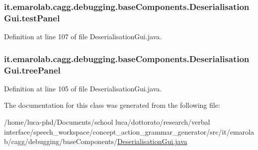 \hypertarget{classit_1_1emarolab_1_1cagg_1_1debugging_1_1baseComponents_1_1DeserialisationGui_a5827585bdffe37f8cedd0af6fddb2052}{
\subsubsection[{test\-Panel}]{ it.\-emarolab.\-cagg.\-debugging.\-base\-Components.\-Deserialisation\-Gui.\-test\-Panel\hspace{0.3cm}{\ttfamily [private]}}}\label{classit_1_1emarolab_1_1cagg_1_1debugging_1_1baseComponents_1_1DeserialisationGui_a5827585bdffe37f8cedd0af6fddb2052}


Definition at line 107 of file Deserialisation\-Gui.\-java.

\hypertarget{classit_1_1emarolab_1_1cagg_1_1debugging_1_1baseComponents_1_1DeserialisationGui_ab9050906e534ba6a751898cef343be5c}{
\subsubsection[{tree\-Panel}]{ it.\-emarolab.\-cagg.\-debugging.\-base\-Components.\-Deserialisation\-Gui.\-tree\-Panel\hspace{0.3cm}{\ttfamily [private]}}}\label{classit_1_1emarolab_1_1cagg_1_1debugging_1_1baseComponents_1_1DeserialisationGui_ab9050906e534ba6a751898cef343be5c}


Definition at line 105 of file Deserialisation\-Gui.\-java.



The documentation for this class was generated from the following file\-:\begin{DoxyCompactItemize}
\item 
/home/luca-\/phd/\-Documents/school luca/dottorato/research/verbal interface/speech\-\_\-workspace/concept\-\_\-action\-\_\-grammar\-\_\-generator/src/it/emarolab/cagg/debugging/base\-Components/\hyperlink{DeserialisationGui_8java}{Deserialisation\-Gui.\-java}\end{DoxyCompactItemize}
